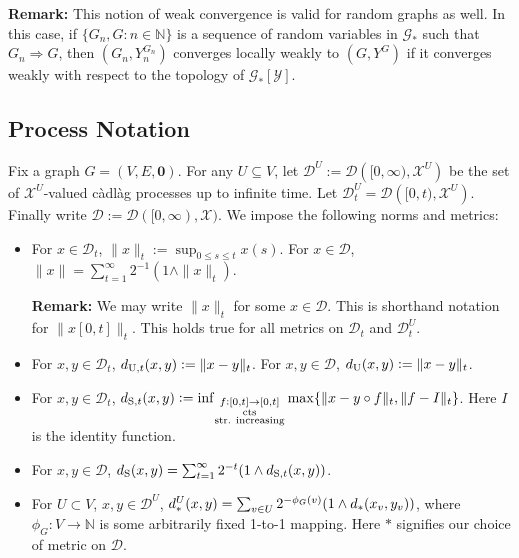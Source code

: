 \documentclass[12pt]{article}
\newcommand{\skipLine}{\vspace{12pt}}
\newcommand{\mb}{\mathbb}
\newcommand{\mc}{\mathcal}
\newcommand{\ra}{\rightarrow}
\newcommand{\te}{\text}
\newcommand{\remark}{\textbf{Remark: }}
\newcommand{\defeq}{:=}								%
\newcommand{\cad}{\mc{D}}							%
\newcommand{\sta}{\mc{X}}							%
\renewcommand{\root}{\mathbf{0}}					%
\newcommand{\utmet}[1]{
\ifstrempty{#1}{
	d_{\te{U}}}{
	d_{\te{U},#1}}}									%
\newcommand{\stmet}[1]{
\ifstrempty{#1}{
	d_{\te{S}}}{
	d_{\te{S},#1}}}									%
\newcommand{\xf}{x}									%
\newcommand{\xg}{y}									%
\newcommand{\met}[2]{
\ifstrempty{#2}{
	d_{#1}}{
	d_{#1,#2}}}										%
\newcommand{\vind}[1]{_{#1}}						%
\newcommand{\tme}[1]{(#1)}							%
\newcommand{\tmi}[1]{#1}							%
\newcommand{\gind}[1]{^{#1}}						%
\newcommand{\vpara}[1]{^{#1}}						%
\newcommand{\tpara}[1]{_{#1}}						%
\newcommand{\Gs}{\mc{G}_\ast}						%
\newcommand{\spce}{\mc{Y}}							%
\renewcommand{\sp}[1]{[#1]}							%
\newcommand{\Xg}{Y}									%
\renewcommand{\it}[1]{_{#1}}						%
\begin{document}
\skipLine

\remark This notion of weak convergence is valid for random graphs as well. In this case, if \(\{G\it{n},G:n\in\mb{N}\}\) is a sequence of random variables in \(\Gs\) such that \(G\it{n}\Rightarrow G\), then \((G\it{n},\Xg\gind{G\it{n}}\it{n})\) converges locally weakly to \((G,\Xg\gind{G})\) if it converges weakly with respect to the topology of \(\Gs\sp{\spce}\).

\subsection{Process Notation}
\label{not::p}

Fix a graph \(G = (V,E,\root)\). For any \(U \subseteq V\), let \(\cad\vpara{U} := \cad\left([0,\infty),\sta^U\right)\) be the set of \(\sta^U\)-valued c\`adl\`ag processes up to infinite time. Let \(\cad\vpara{U}\tpara{t} = \cad\left([0,t),\sta^U\right)\). Finally write \(\cad \defeq \cad([0,\infty),\sta)\). We impose the following norms and metrics:

\begin{itemize}
\item For \(\xf \in \cad\tpara{t}\), \(\|\xf\|\tpara{t} \defeq \sup_{0\leq s \leq t} \xf\tme{s}\). For \(\xf \in \cad\), \(\|\xf\| = \sum_{t=1}^\infty 2^{-1}(1\wedge \|\xf\|\tpara{t})\).

\skipLine

\remark We may write \(\|\xf\|_t\) for some \(\xf \in \cad\). This is shorthand notation for \(\|\xf\tmi{[0,t]}\|_t\). This holds true for all metrics on \(\cad\tpara{t}\) and \(\cad\vpara{U}\tpara{t}\).

\skipLine 

\item For \(\xf,\xg \in \cad\tpara{t}\), \(\utmet{t}(\xf,\xg) \defeq \|\xf-\xg\|\tpara{t}\). For \(\xf,\xg \in \cad\), \(\utmet{}(\xf,\xg) \defeq \|\xf - \xg\|\tpara{t}\).

\item For \(\xf,\xg \in \cad\tpara{t}\), \(\stmet{t}(\xf,\xg)  \defeq \inf_{\substack{f:[0,t]\ra[0,t]\\\te{cts}\\\te{str. increasing}}}\max\{\|\xf-\xg\circ f\|\tpara{t},\|f - I\|\tpara{t}\}\). Here \(I\) is the identity function.

\item For \(\xf,\xg \in \cad\), \(\stmet{}(\xf,\xg) = \sum_{t=1}^\infty 2^{-t}(1\wedge \stmet{t}(\xf,\xg))\).

\item For \(U \subset V\), \(\xf,\xg\in \cad\vpara{U}\), \(\met{\ast}{}\vpara{U}(\xf,\xg) = \sum_{v \in U} 2^{-\phi_G(v)}(1\wedge \met{\ast}{}(\xf\vind{v},\xg\vind{v}))\), where \(\phi_G: V \ra \mb{N}\) is some arbitrarily fixed 1-to-1 mapping. Here \(\ast\) signifies our choice of metric on \(\cad\).
\end{itemize}
\end{document}
